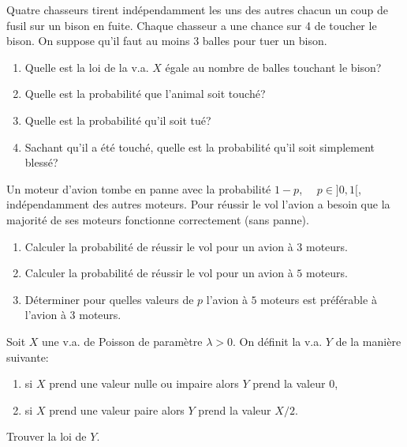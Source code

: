 \documentclass[a4paper,12pt,reqno]{amsart}
\begin{document}
\begin{exo}

  Quatre chasseurs tirent indépendamment les uns des autres  chacun un coup de fusil  sur un bison en fuite. Chaque chasseur a une chance sur 4 de toucher le bison. On suppose qu'il faut au moins 3 balles pour tuer un bison.

  \begin{enumerate}
    \item Quelle est la loi de la v.a. $X$ égale au nombre de balles touchant le bison?
    \item Quelle est la probabilité que l'animal soit touché?
    \item Quelle est la probabilité qu'il soit tué?
    \item Sachant qu'il a été touché, quelle est la probabilité qu'il soit simplement blessé?
  \end{enumerate}

\end{exo}

\begin{exo}

  Un moteur d'avion tombe en panne avec la probabilité $1-p$,~~ $p \in ]0,1[$, indépendamment des autres moteurs. Pour réussir le vol l'avion a besoin que la majorité de ses moteurs fonctionne correctement (sans panne).

  \begin{enumerate}
    \item Calculer la probabilité de réussir le vol pour un avion à $3$ moteurs.
    \item Calculer la probabilité de réussir le vol pour un avion à $5$ moteurs.
    \item Déterminer pour quelles valeurs de $p$ l'avion à $5$ moteurs est préférable à l'avion à $3$ moteurs.
  \end{enumerate}

\end{exo}

\begin{exo}

  Soit $X$ une v.a. de Poisson de paramètre $\lambda>0$. On définit la v.a. $Y$ de la manière suivante:
  \begin{enumerate}
    \item si $X$ prend une valeur nulle ou impaire alors $Y$ prend la valeur $0$,
    \item si $X$ prend une valeur paire alors $Y$ prend la valeur $X/2$.
  \end{enumerate}
  Trouver la loi de $Y$.

\end{exo}
\end{document}

